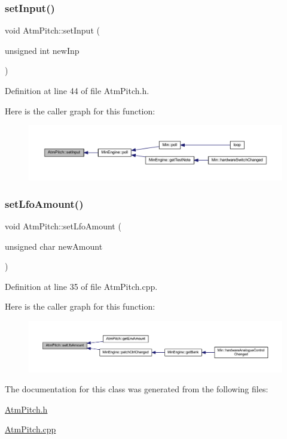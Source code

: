 \subsubsection{\texorpdfstring{set\+Input()}{setInput()}}
{\footnotesize\ttfamily void Atm\+Pitch\+::set\+Input (\begin{DoxyParamCaption}\item[{unsigned int}]{new\+Inp }\end{DoxyParamCaption})\hspace{0.3cm}{\ttfamily [inline]}}



Definition at line 44 of file Atm\+Pitch.\+h.

Here is the caller graph for this function\+:
\nopagebreak
\begin{figure}[H]
\begin{center}
\leavevmode
\includegraphics[width=350pt]{class_atm_pitch_a5e7f1f2581cc25bb966fdfe0c945923d_icgraph}
\end{center}
\end{figure}
\mbox{\label{class_atm_pitch_a4d4617a54ac352f240b72f3b2194b6c7}} 
\subsubsection{\texorpdfstring{set\+Lfo\+Amount()}{setLfoAmount()}}
{\footnotesize\ttfamily void Atm\+Pitch\+::set\+Lfo\+Amount (\begin{DoxyParamCaption}\item[{unsigned char}]{new\+Amount }\end{DoxyParamCaption})}



Definition at line 35 of file Atm\+Pitch.\+cpp.

Here is the caller graph for this function\+:
\nopagebreak
\begin{figure}[H]
\begin{center}
\leavevmode
\includegraphics[width=350pt]{class_atm_pitch_a4d4617a54ac352f240b72f3b2194b6c7_icgraph}
\end{center}
\end{figure}


The documentation for this class was generated from the following files\+:\begin{DoxyCompactItemize}
\item 
\hyperlink{_atm_pitch_8h}{Atm\+Pitch.\+h}\item 
\hyperlink{_atm_pitch_8cpp}{Atm\+Pitch.\+cpp}\end{DoxyCompactItemize}
